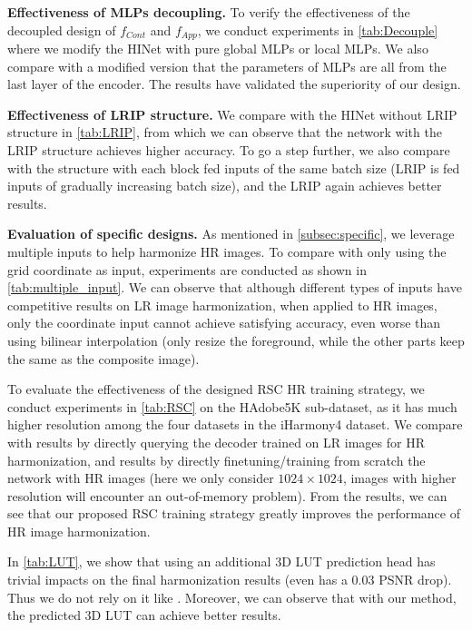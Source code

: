 \documentclass[10pt,journal,twocolumn,twoside]{IEEEtran}
\begin{document}
\textbf{Effectiveness of MLPs decoupling.} To verify the effectiveness of the decoupled design of $f_{Cont}$ and $f_{App}$, we conduct experiments in \cref{tab:Decouple} where we modify the HINet with pure global MLPs or local MLPs. We also compare with a modified version that the parameters of MLPs are all from the last layer of the encoder. The results have validated the superiority of our design.

\textbf{Effectiveness of LRIP structure.} We compare with the HINet without LRIP structure in \cref{tab:LRIP}, from which we can observe that the network with the LRIP structure achieves higher accuracy. To go a step further, we also compare with the structure with each block fed inputs of the same batch size (LRIP is fed inputs of gradually increasing batch size), and the LRIP again achieves better results.

\textbf{Evaluation of specific designs.} As mentioned in \cref{subsec:specific}, we leverage multiple inputs to help harmonize HR images. To compare with only using the grid coordinate as input, experiments are conducted as shown in \cref{tab:multiple_input}. We can observe that although different types of inputs have competitive results on LR image harmonization, when applied to HR images, only the coordinate input cannot achieve satisfying accuracy, even worse than using bilinear interpolation (only resize the foreground, while the other parts keep the same as the composite image).

To evaluate the effectiveness of the designed RSC HR training strategy, we conduct experiments in \cref{tab:RSC} on the HAdobe5K sub-dataset, as it has much higher resolution among the four datasets in the iHarmony4 dataset\cite{cong2022high}. We compare with results by directly querying the decoder trained on LR images for HR harmonization, and results by directly finetuning/training from scratch the network with HR images (here we only consider $1024\times1024$, images with higher resolution will encounter an out-of-memory problem). From the results, we can see that our proposed RSC training strategy greatly improves the performance of HR image harmonization.

In \cref{tab:LUT}, we show that using an additional 3D LUT prediction head has trivial impacts on the final harmonization results (even has a 0.03 PSNR drop). Thus we do not rely on it like \cite{cong2022high, xue2022dccf, ke2022harmonizer}. Moreover, we can observe that with our method, the predicted 3D LUT can achieve better results.
\end{document}
